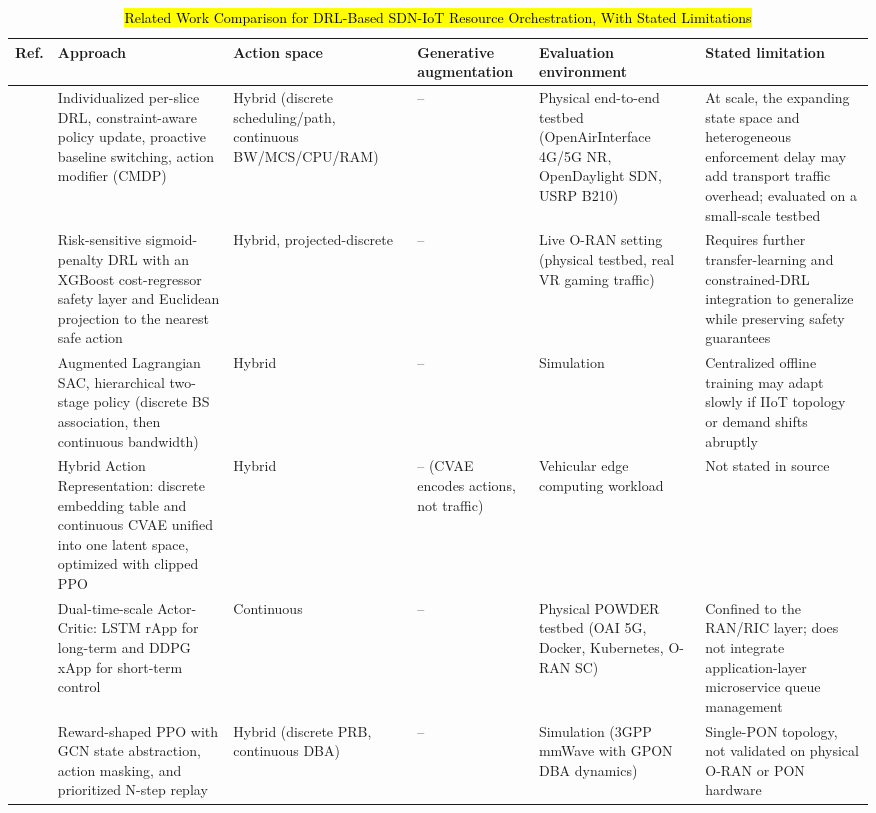 \documentclass[conference]{IEEEtran}
\newcommand{\rev}[1]{\hl{#1}}
\newcommand{\revhdr}{\rowcolor{yellow!45}}
\begin{document}
\begin{table}[t]
\centering
\caption{\rev{Related Work Comparison for DRL-Based SDN-IoT Resource Orchestration, With Stated Limitations}}
\label{tab:1}
\scriptsize
\begin{tabular}{p{1.1cm}p{3.3cm}p{1.7cm}p{1.2cm}p{2.7cm}p{4.3cm}}
\toprule
\revhdr Ref. & Approach & Action space & Generative augmentation & Evaluation environment & Stated limitation \\
\midrule
\cite{b40} & Individualized per-slice DRL, constraint-aware policy update, proactive baseline switching, action modifier (CMDP) & Hybrid (discrete scheduling/path, continuous BW/MCS/CPU/RAM) & -- & Physical end-to-end testbed (OpenAirInterface 4G/5G NR, OpenDaylight SDN, USRP B210) & At scale, the expanding state space and heterogeneous enforcement delay may add transport traffic overhead; evaluated on a small-scale testbed \\
\cite{b41} & Risk-sensitive sigmoid-penalty DRL with an XGBoost cost-regressor safety layer and Euclidean projection to the nearest safe action & Hybrid, projected-discrete & -- & Live O-RAN setting (physical testbed, real VR gaming traffic) & Requires further transfer-learning and constrained-DRL integration to generalize while preserving safety guarantees \\
\cite{b42} & Augmented Lagrangian SAC, hierarchical two-stage policy (discrete BS association, then continuous bandwidth) & Hybrid & -- & Simulation & Centralized offline training may adapt slowly if IIoT topology or demand shifts abruptly \\
\cite{b43} & Hybrid Action Representation: discrete embedding table and continuous CVAE unified into one latent space, optimized with clipped PPO & Hybrid & -- (CVAE encodes actions, not traffic) & Vehicular edge computing workload & Not stated in source \\
\cite{b44} & Dual-time-scale Actor-Critic: LSTM rApp for long-term and DDPG xApp for short-term control & Continuous & -- & Physical POWDER testbed (OAI 5G, Docker, Kubernetes, O-RAN SC) & Confined to the RAN/RIC layer; does not integrate application-layer microservice queue management \\
\cite{b45} & Reward-shaped PPO with GCN state abstraction, action masking, and prioritized N-step replay & Hybrid (discrete PRB, continuous DBA) & -- & Simulation (3GPP mmWave with GPON DBA dynamics) & Single-PON topology, not validated on physical O-RAN or PON hardware \\

\end{tabular}
\end{table}
\end{document}
